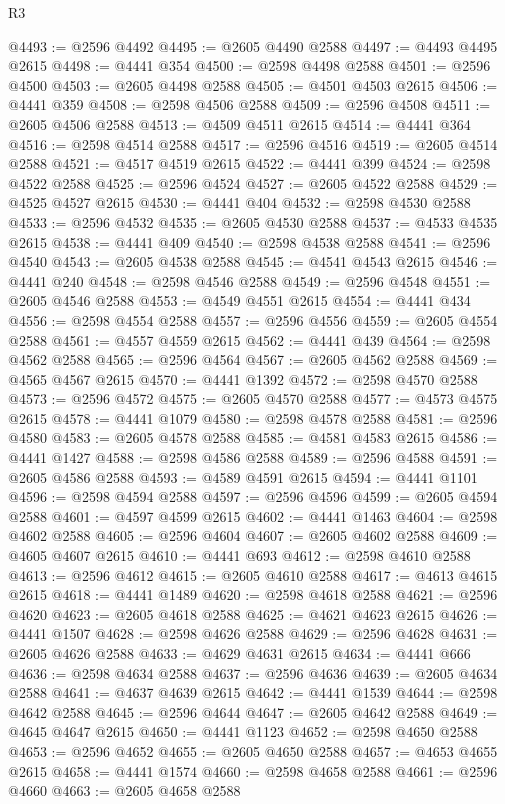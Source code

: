 \begin{lexlean}{R3}
\begin{coremodule}
@4493 := @2596 @4492
@4495 := @2605 @4490 @2588
@4497 := @4493 @4495 @2615
@4498 := @4441 @354
@4500 := @2598 @4498 @2588
@4501 := @2596 @4500
@4503 := @2605 @4498 @2588
@4505 := @4501 @4503 @2615
@4506 := @4441 @359
@4508 := @2598 @4506 @2588
@4509 := @2596 @4508
@4511 := @2605 @4506 @2588
@4513 := @4509 @4511 @2615
@4514 := @4441 @364
@4516 := @2598 @4514 @2588
@4517 := @2596 @4516
@4519 := @2605 @4514 @2588
@4521 := @4517 @4519 @2615
@4522 := @4441 @399
@4524 := @2598 @4522 @2588
@4525 := @2596 @4524
@4527 := @2605 @4522 @2588
@4529 := @4525 @4527 @2615
@4530 := @4441 @404
@4532 := @2598 @4530 @2588
@4533 := @2596 @4532
@4535 := @2605 @4530 @2588
@4537 := @4533 @4535 @2615
@4538 := @4441 @409
@4540 := @2598 @4538 @2588
@4541 := @2596 @4540
@4543 := @2605 @4538 @2588
@4545 := @4541 @4543 @2615
@4546 := @4441 @240
@4548 := @2598 @4546 @2588
@4549 := @2596 @4548
@4551 := @2605 @4546 @2588
@4553 := @4549 @4551 @2615
@4554 := @4441 @434
@4556 := @2598 @4554 @2588
@4557 := @2596 @4556
@4559 := @2605 @4554 @2588
@4561 := @4557 @4559 @2615
@4562 := @4441 @439
@4564 := @2598 @4562 @2588
@4565 := @2596 @4564
@4567 := @2605 @4562 @2588
@4569 := @4565 @4567 @2615
@4570 := @4441 @1392
@4572 := @2598 @4570 @2588
@4573 := @2596 @4572
@4575 := @2605 @4570 @2588
@4577 := @4573 @4575 @2615
@4578 := @4441 @1079
@4580 := @2598 @4578 @2588
@4581 := @2596 @4580
@4583 := @2605 @4578 @2588
@4585 := @4581 @4583 @2615
@4586 := @4441 @1427
@4588 := @2598 @4586 @2588
@4589 := @2596 @4588
@4591 := @2605 @4586 @2588
@4593 := @4589 @4591 @2615
@4594 := @4441 @1101
@4596 := @2598 @4594 @2588
@4597 := @2596 @4596
@4599 := @2605 @4594 @2588
@4601 := @4597 @4599 @2615
@4602 := @4441 @1463
@4604 := @2598 @4602 @2588
@4605 := @2596 @4604
@4607 := @2605 @4602 @2588
@4609 := @4605 @4607 @2615
@4610 := @4441 @693
@4612 := @2598 @4610 @2588
@4613 := @2596 @4612
@4615 := @2605 @4610 @2588
@4617 := @4613 @4615 @2615
@4618 := @4441 @1489
@4620 := @2598 @4618 @2588
@4621 := @2596 @4620
@4623 := @2605 @4618 @2588
@4625 := @4621 @4623 @2615
@4626 := @4441 @1507
@4628 := @2598 @4626 @2588
@4629 := @2596 @4628
@4631 := @2605 @4626 @2588
@4633 := @4629 @4631 @2615
@4634 := @4441 @666
@4636 := @2598 @4634 @2588
@4637 := @2596 @4636
@4639 := @2605 @4634 @2588
@4641 := @4637 @4639 @2615
@4642 := @4441 @1539
@4644 := @2598 @4642 @2588
@4645 := @2596 @4644
@4647 := @2605 @4642 @2588
@4649 := @4645 @4647 @2615
@4650 := @4441 @1123
@4652 := @2598 @4650 @2588
@4653 := @2596 @4652
@4655 := @2605 @4650 @2588
@4657 := @4653 @4655 @2615
@4658 := @4441 @1574
@4660 := @2598 @4658 @2588
@4661 := @2596 @4660
@4663 := @2605 @4658 @2588

\end{coremodule}
\end{lexlean}
